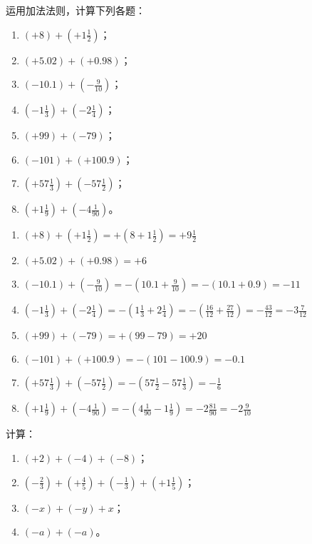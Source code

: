 \begin{example}
    运用加法法则，计算下列各题：
    \begin{multicols}{2}
        \begin{enumerate}
    \item $(+8)+\left(+1\frac{1}{2}\right)$；
    \item $(+5.02)+\left(+0.98\right)$；
    \item $(-10.1)+\left(-\frac{9}{10}\right)$；
    \item $\left(-1\frac{1}{3}\right)+\left(-2\frac{1}{4}\right)$；
    \item $(+99)+(-79)$；
    \item $(-101)+(+100.9)$；
    \item $(+57\frac{1}{3})+\left(-57\frac{1}{2}\right)$；
    \item $\left(+1\frac{1}{9}\right)+\left(-4\frac{1}{90}\right)$。
\end{enumerate}
    \end{multicols}
\end{example}    
    
\begin{solution}
\begin{enumerate}
    \item $(+8)+\left(+1\frac{1}{2}\right)=+\left(8+1\frac{1}{2}\right)=+9\frac{1}{2}$
    \item $(+5.02)+\left(+0.98\right)=+6$
    \item $(-10.1)+\left(-\frac{9}{10}\right)=-\left(10.1+\frac{9}{10}\right)=-(10.1+0.9)=-11$
    \item $\left(-1\frac{1}{3}\right)+\left(-2\frac{1}{4}\right)=-\left(1\frac{1}{3}+2\frac{1}{4}\right)=-\left(\frac{16}{12}+\frac{27}{12}\right)=-\frac{43}{12}=-3\frac{7}{12}$
    \item $(+99)+(-79)=+(99-79)=+20$
    \item $(-101)+(+100.9)=-(101-100.9)=-0.1$
    \item $(+57\frac{1}{3})+\left(-57\frac{1}{2}\right)=-\left(57\frac{1}{2}-57\frac{1}{3}\right)=-\frac{1}{6}$
    \item $\left(+1\frac{1}{9}\right)+\left(-4\frac{1}{90}\right)=-\left(4\frac{1}{90}-1\frac{1}{9}\right)=-2\frac{81}{90}=-2\frac{9}{10}$
    
\end{enumerate}

\end{solution}

\begin{example}
计算：
\begin{enumerate}
    \item $(+2)+(-4)+(-8)$；
    \item $\left(-\frac{2}{3}\right)+\left(+\frac{4}{5}\right)+\left(-\frac{1}{3}\right)+\left(+1\frac{1}{5}\right)$；
    \item $(-x)+(-y)+x$；
    \item $(-a)+(-a)$。
\end{enumerate}
\end{example}

